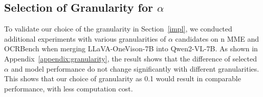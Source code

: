 \subsection{Selection of Granularity for \texorpdfstring{$\alpha$}{alpha}}
\label{sec:interval}
To validate our choice of the granularity in Section~\ref{impl}, we conducted additional experiments with various granularities of $\alpha$ candidates on n MME and OCRBench when merging LLaVA-OneVison-7B into Qwen2-VL-7B. As shown in Appendix~\ref{appendix:granularity}, the result shows that the difference of selected $\alpha$ and model performance do not change significantly with different granularities. This shows that our choice of granularity as 0.1 would result in comparable performance, with less computation cost.







% 






% 